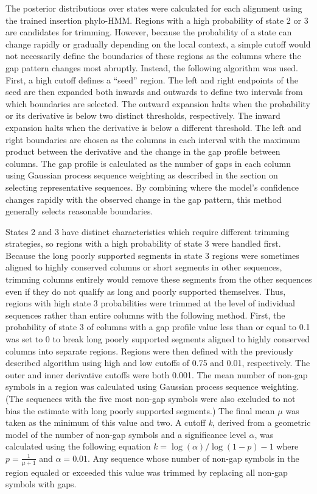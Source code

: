 The posterior distributions over states were calculated for each alignment using the trained insertion phylo-HMM. Regions with a high probability of state 2 or 3 are candidates for trimming. However, because the probability of a state can change rapidly or gradually depending on the local context, a simple cutoff would not necessarily define the boundaries of these regions as the columns where the gap pattern changes most abruptly. Instead, the following algorithm was used. First, a high cutoff defines a ``seed'' region. The left and right endpoints of the seed are then expanded both inwards and outwards to define two intervals from which boundaries are selected. The outward expansion halts when the probability or its derivative is below two distinct thresholds, respectively. The inward expansion halts when the derivative is below a different threshold. The left and right boundaries are chosen as the columns in each interval with the maximum product between the derivative and the change in the gap profile between columns. The gap profile is calculated as the number of gaps in each column using Gaussian process sequence weighting as described in the section on selecting representative sequences. By combining where the model’s confidence changes rapidly with the observed change in the gap pattern, this method generally selects reasonable boundaries.

 States 2 and 3 have distinct characteristics which require different trimming strategies, so regions with a high probability of state 3 were handled first. Because the long poorly supported segments in state 3 regions were sometimes aligned to highly conserved columns or short segments in other sequences, trimming columns entirely would remove these segments from the other sequences even if they do not qualify as long and poorly supported themselves. Thus, regions with high state 3 probabilities were trimmed at the level of individual sequences rather than entire columns with the following method. First, the probability of state 3 of columns with a gap profile value less than or equal to 0.1 was set to 0 to break long poorly supported segments aligned to highly conserved columns into separate regions. Regions were then defined with the previously described algorithm using high and low cutoffs of 0.75 and 0.01, respectively. The outer and inner derivative cutoffs were both 0.001. The mean number of non-gap symbols in a region was calculated using Gaussian process sequence weighting. (The sequences with the five most non-gap symbols were also excluded to not bias the estimate with long poorly supported segments.) The final mean $\mu$ was taken as the minimum of this value and two. A cutoff \textit{k}, derived from a geometric model of the number of non-gap symbols and a significance level $\alpha$, was calculated using the following equation $k = \log(\alpha) / \log(1 - p) - 1$ where $p = \frac{1}{\mu + 1}$ and $\alpha = 0.01$. Any sequence whose number of non-gap symbols in the region equaled or exceeded this value was trimmed by replacing all non-gap symbols with gaps.


